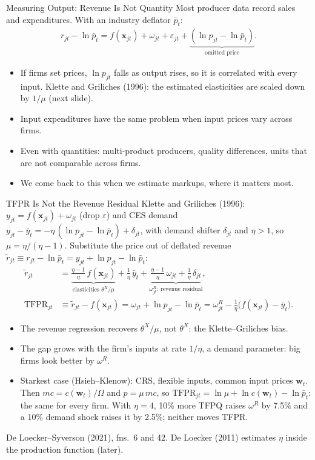 \documentclass[aspectratio=169,10pt]{beamer}
\begin{document}
\begin{frame}{Measuring Output: Revenue Is Not Quantity}
Most producer data record sales and expenditures. With an industry deflator $\bar p_t$:
\begin{align*}
r_{jt} - \ln \bar p_t = f(\mathbf{x}_{jt}) + \omega_{jt} + \varepsilon_{jt} + \underbrace{(\ln p_{jt} - \ln \bar p_t)}_{\text{omitted price}}.
\end{align*}
\begin{itemize}
\item If firms set prices, $\ln p_{jt}$ falls as output rises, so it is correlated with every input. Klette and Griliches (1996): the estimated elasticities are scaled down by $1/\mu$ (next slide).
\item Input expenditures have the same problem when input prices vary across firms.
\item Even with quantities: multi-product producers, quality differences, units that are not comparable across firms.
\item We come back to this when we estimate markups, where it matters most.
\end{itemize}
\end{frame}


\begin{frame}{TFPR Is Not the Revenue Residual}
\small
Klette and Griliches (1996): $y_{jt} = f(\mathbf{x}_{jt}) + \omega_{jt}$ (drop $\varepsilon$) and CES demand $y_{jt} - \bar y_t = -\eta\,(\ln p_{jt} - \ln \bar p_t) + \delta_{jt}$, with demand shifter $\delta_{jt}$ and $\eta > 1$, so $\mu = \eta/(\eta - 1)$. Substitute the price out of deflated revenue $\tilde r_{jt} \equiv r_{jt} - \ln \bar p_t = y_{jt} + \ln p_{jt} - \ln \bar p_t$:
\begin{align*}
\tilde r_{jt} &= \underbrace{\tfrac{\eta-1}{\eta}\, f(\mathbf{x}_{jt})}_{\text{elasticities } \theta^X/\mu} + \tfrac{1}{\eta}\, \bar y_t + \underbrace{\tfrac{\eta-1}{\eta}\, \omega_{jt} + \tfrac{1}{\eta}\, \delta_{jt}}_{\omega^R_{jt}:\ \text{revenue residual}}, \\
\text{TFPR}_{jt} &\equiv \tilde r_{jt} - f(\mathbf{x}_{jt}) = \omega_{jt} + \ln p_{jt} - \ln \bar p_t = \omega^R_{jt} - \tfrac{1}{\eta}\big(f(\mathbf{x}_{jt}) - \bar y_t\big).
\end{align*}
\begin{itemize}
\item The revenue regression recovers $\theta^X/\mu$, not $\theta^X$: the Klette--Griliches bias.
\item The gap grows with the firm's inputs at rate $1/\eta$, a demand parameter: big firms look better by $\omega^R$.
\item Starkest case (Hsieh--Klenow): CRS, flexible inputs, common input prices $\mathbf{w}_t$. Then $mc = c(\mathbf{w}_t)/\Omega$ and $p = \mu\, mc$, so $\text{TFPR}_{jt} = \ln \mu + \ln c(\mathbf{w}_t) - \ln \bar p_t$: \alert{the same for every firm}. With $\eta = 4$, 10\% more TFPQ raises $\omega^R$ by 7.5\% and a 10\% demand shock raises it by 2.5\%; neither moves TFPR.
\end{itemize}
{\footnotesize De Loecker--Syverson (2021), fns.\ 6 and 42. De Loecker (2011) estimates $\eta$ inside the production function (later).}
\end{frame}
\end{document}
